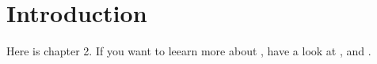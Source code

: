 \chapter{Introduction}\label{ch:introduction}
Here is chapter 2. If you want to leearn  more about \LaTeXe{}, have a look at \citep{Madsen2010}, \citep{Oetiker2010} and \citep{Howard93fastand}.

